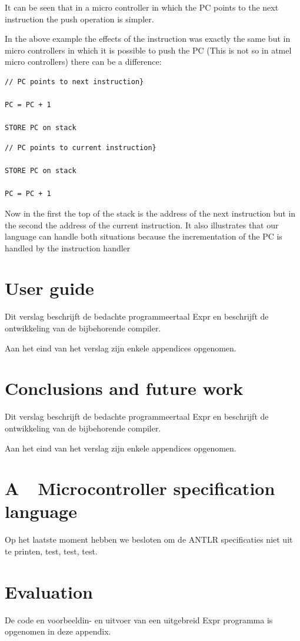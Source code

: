 \documentclass[a4paper]{report}
\begin{document}
It can be seen that in a micro controller in which the PC points to the
next instruction the push operation is simpler.

In the above example the effects of the instruction was exactly the same
but in micro controllers in which it is possible to push the PC (This
is not so in atmel micro controllers) there can be a difference:

\begin{verbatim}
// PC points to next instruction}

PC = PC + 1

STORE PC on stack
\end{verbatim}

\begin{verbatim}
// PC points to current instruction}

STORE PC on stack

PC = PC + 1
\end{verbatim}

Now in the first the top of the stack is the address of the next
instruction but in the second the address of the current instruction.
It also illustrates that our language can handle both situations
because the incrementation of the PC is handled by the instruction
handler

\chapter{User guide}
Dit verslag beschrijft de bedachte programmeertaal Expr en beschrijft de
ontwikkeling van de bijbehorende compiler.

Aan het eind van het verslag zijn enkele appendices opgenomen. 

\chapter{Conclusions and future work}
Dit verslag beschrijft de bedachte programmeertaal Expr en beschrijft de
ontwikkeling van de bijbehorende compiler.

Aan het eind van het verslag zijn enkele appendices opgenomen. 

\appendix
\chapter[Microcontroller specification
language]{A\ \ Microcontroller specification language}
Op het laatste moment hebben we besloten om de ANTLR specificaties niet
uit te printen, test, test, test.

\chapter[Evaluation]{Evaluation}
De code en voorbeeldin- en uitvoer van een uitgebreid Expr programma is
opgenomen in deze appendix.
\end{document}
